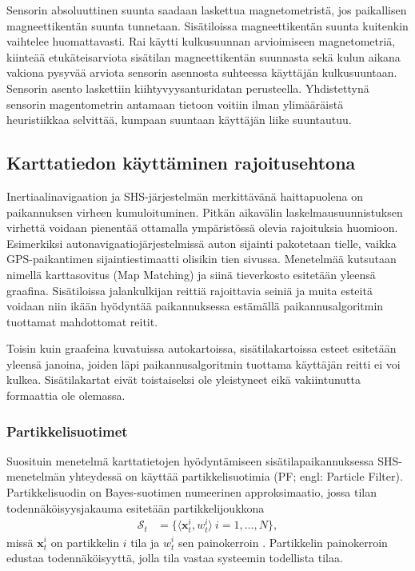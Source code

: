 Sensorin absoluuttinen suunta saadaan laskettua magnetometristä, jos paikallisen
magneettikentän suunta tunnetaan. Sisätiloissa magneettikentän suunta
kuitenkin vaihtelee huomattavasti. Rai \cite{rai2012} käytti kulkusuunnan
arvioimiseen magnetometriä, kiinteää etukäteisarviota sisätilan
magneettikentän suunnasta sekä kulun aikana vakiona pysyvää arviota
sensorin asennosta suhteessa käyttäjän kulkusuuntaan. Sensorin asento
laskettiin kiihtyvyysanturidatan perusteella. Yhdistettynä sensorin
magentometrin antamaan tietoon voitiin ilman ylimääräistä
heuristiikkaa selvittää, kumpaan suuntaan käyttäjän
liike suuntautuu.

\subsection{Karttatiedon käyttäminen rajoitusehtona}

Inertiaalinavigaation ja SHS-järjestelmän merkittävänä haittapuolena on
paikannuksen virheen kumuloituminen. Pitkän aikavälin laskelmausuunnistuksen
virhettä voidaan pienentää ottamalla ympäristössä olevia rajoituksia
huomioon. Esimerkiksi autonavigaatiojärjestelmissä auton sijainti pakotetaan
tielle, vaikka GPS-paikantimen sijaintiestimaatti olisikin tien sivussa.
Menetelmää kutsutaan nimellä karttasovitus (Map Matching) ja siinä
tieverkosto esitetään yleensä graafina. Sisätiloissa jalankulkijan reittiä
rajoittavia seiniä ja muita esteitä voidaan niin ikään hyödyntää paikannuksessa
estämällä paikannusalgoritmin tuottamat mahdottomat reitit.

Toisin kuin graafeina kuvatuissa autokartoissa, sisätilakartoissa esteet
esitetään yleensä janoina, joiden läpi paikannusalgoritmin tuottama käyttäjän
reitti ei voi kulkea. Sisätilakartat eivät toistaiseksi ole yleistyneet
eikä vakiintunutta formaattia ole olemassa.

\subsubsection{Partikkelisuotimet}

Suosituin menetelmä karttatietojen hyödyntämiseen sisätilapaikannuksessa
SHS-menetelmän yhteydessä
on käyttää partikkelisuotimia (PF; engl: Particle Filter).
Partikkelisuodin on Bayes-suotimen numeerinen approksimaatio, jossa
tilan todennäköisyysjakauma esitetään partikkelijoukkona
\begin{align}
\mathcal{S}_t &= \{\langle\mathbf{x}_t^i,w_t^i\rangle \ i = 1,\ldots,N\},
\end{align}
missä $\mathbf{x}_t^i$ on partikkelin $i$ tila ja $w_t^i$ sen painokerroin
\cite{woodman2010}.
Partikkelin painokerroin edustaa todennäköisyyttä, jolla tila vastaa
systeemin todellista tilaa.

